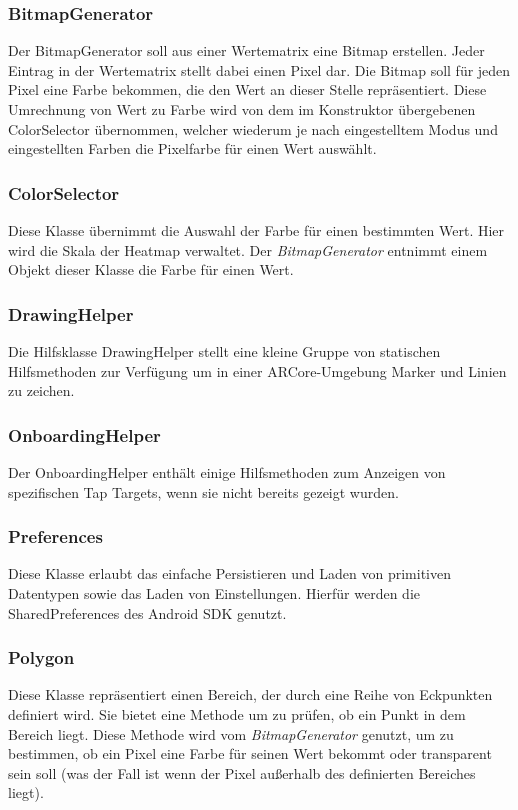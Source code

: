 \documentclass[10pt]{scrartcl}
\begin{document}
\subsubsection{BitmapGenerator}
Der BitmapGenerator soll aus einer Wertematrix eine Bitmap erstellen. Jeder Eintrag in der Wertematrix stellt dabei einen Pixel dar. Die Bitmap soll für jeden Pixel eine Farbe bekommen, die den Wert an dieser Stelle repräsentiert. Diese Umrechnung von Wert zu Farbe wird von dem im Konstruktor übergebenen ColorSelector übernommen, welcher wiederum je nach eingestelltem Modus und eingestellten Farben die Pixelfarbe für einen Wert auswählt.

\subsubsection{ColorSelector}
Diese Klasse übernimmt die Auswahl der Farbe für einen bestimmten Wert. Hier wird die Skala der Heatmap verwaltet. Der \textit{BitmapGenerator} entnimmt einem Objekt dieser Klasse die Farbe für einen Wert.

\subsubsection{DrawingHelper}
Die Hilfsklasse DrawingHelper stellt eine kleine Gruppe von statischen Hilfsmethoden zur Verfügung um in einer ARCore-Umgebung Marker und Linien zu zeichen.

\subsubsection{OnboardingHelper}
Der OnboardingHelper enthält einige Hilfsmethoden zum Anzeigen von spezifischen Tap Targets, wenn sie nicht bereits gezeigt wurden.

\subsubsection{Preferences}
Diese Klasse erlaubt das einfache Persistieren und Laden von primitiven Datentypen sowie das Laden von Einstellungen. Hierfür werden die SharedPreferences des Android SDK genutzt.

\subsubsection{Polygon}
Diese Klasse repräsentiert einen Bereich, der durch eine Reihe von Eckpunkten definiert wird. Sie bietet eine Methode um zu prüfen, ob ein Punkt in dem Bereich liegt. Diese Methode wird vom \textit{BitmapGenerator} genutzt, um zu bestimmen, ob ein Pixel eine Farbe für seinen Wert bekommt oder transparent sein soll (was der Fall ist wenn der Pixel außerhalb des definierten Bereiches liegt).
\end{document}
